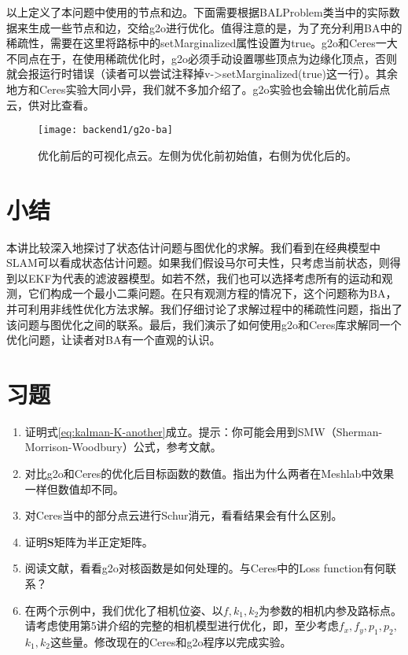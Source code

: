 以上定义了本问题中使用的节点和边。下面需要根据BALProblem类当中的实际数据来生成一些节点和边，交给g2o进行优化。值得注意的是，为了充分利用BA中的稀疏性，需要在这里将路标中的setMarginalized属性设置为true。g2o和Ceres一大不同点在于，在使用稀疏优化时，g2o必须手动设置哪些顶点为边缘化顶点，否则就会报运行时错误（读者可以尝试注释掉v->setMarginalized(true)这一行）。其余地方和Ceres实验大同小异，我们就不多加介绍了。g2o实验也会输出优化前后点云，供对比查看。

\begin{figure}[!htp]
	\centering
	\texttt{[image: backend1/g2o-ba]}
	\caption{优化前后的可视化点云。左侧为优化前初始值，右侧为优化后的。}
	\label{fig:g2o-BA}
\end{figure}

\section{小结}
本讲比较深入地探讨了状态估计问题与图优化的求解。我们看到在经典模型中SLAM可以看成状态估计问题。如果我们假设马尔可夫性，只考虑当前状态，则得到以EKF为代表的滤波器模型。如若不然，我们也可以选择考虑所有的运动和观测，它们构成一个最小二乘问题。在只有观测方程的情况下，这个问题称为BA，并可利用非线性优化方法求解。我们仔细讨论了求解过程中的稀疏性问题，指出了该问题与图优化之间的联系。最后，我们演示了如何使用g2o和Ceres库求解同一个优化问题，让读者对BA有一个直观的认识。

\section*{习题}
\begin{enumerate}
	\item 证明式\eqref{eq:kalman-K-another}成立。提示：你可能会用到SMW（Sherman-Morrison-Woodbury）公式，参考文献\cite{Sherman1950, Barfoot2016}。
	\item 
	对比g2o和Ceres的优化后目标函数的数值。指出为什么两者在Meshlab中效果一样但数值却不同。
	\item 
	对Ceres当中的部分点云进行Schur消元，看看结果会有什么区别。
	\item 证明$\bm{S}$矩阵为半正定矩阵。
	\item 阅读文献\cite{Kummerle2011}，看看g2o对核函数是如何处理的。与Ceres中的Loss function有何联系？
	\item[\optional] 在两个示例中，我们优化了相机位姿、以$f, k_1, k_2$为参数的相机内参及路标点。请考虑使用第5讲介绍的完整的相机模型进行优化，即，至少考虑$f_x, f_y, p_1, p_2,$ $k_1, k_2$这些量。修改现在的Ceres和g2o程序以完成实验。
\end{enumerate}
